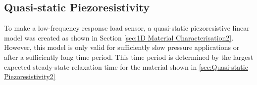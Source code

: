 
\subsection{Quasi-static Piezoresistivity}\label{Quasi-static Piezoresistivity3}
To make a low-frequency response load sensor, a quasi-static piezoresistive linear model was created as shown in Section \ref{sec:1D Material Characterisation2}. However, this model is only valid for sufficiently slow pressure applications or after a sufficiently long time period. This time period is determined by the largest expected steady-state relaxation time for the material shown in \ref{sec:Quasi-static Piezoresistivity2}


